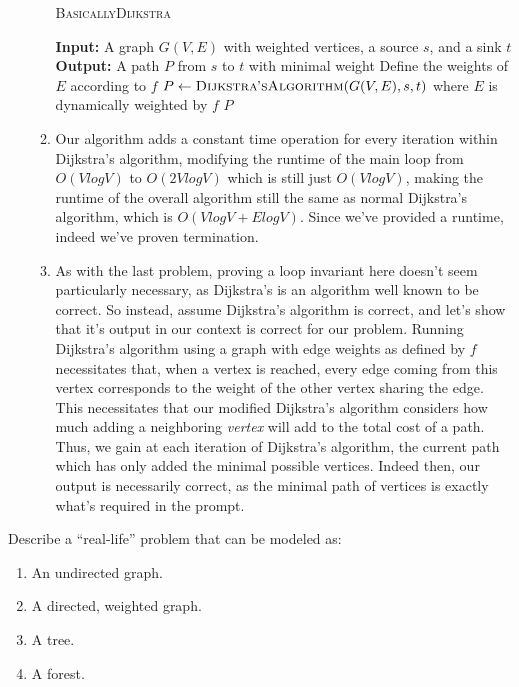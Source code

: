 \documentclass{article}
\begin{document}
\begin{enumerate}
\begin{enumerate}
		\begin{algorithm}
			\begin{algorithmic}
				\caption{\textsc{BasicallyDijkstra}}
				\State \textbf{Input:} A graph $G(V,E)$ with weighted vertices, a source $s$, and a sink $t$
				\State \textbf{Output:} A path $P$ from $s$ to $t$ with minimal weight
				\State Define the weights of $E$ according to $f$
				\State $P \gets \textsc{Dijkstra'sAlgorithm}(G(V,E), s, t)$ where $E$ is dynamically weighted by $f$
				\State \Return $P$
			\end{algorithmic}
		\end{algorithm}
			\item Our algorithm adds a constant time operation for every iteration within Dijkstra's algorithm, modifying
				the runtime of the main loop from $O(VlogV)$ to $O(2VlogV)$ which is still just $O(VlogV)$, making the
				runtime of the overall algorithm still the same as normal Dijkstra's algorithm, which is $O(VlogV + ElogV)$.
				Since we've provided a runtime, indeed we've proven termination.
			\item As with the last problem, proving a loop invariant here doesn't seem particularly necessary, as Dijkstra's
				is an algorithm well known to be correct. So instead, assume Dijkstra's algorithm is correct, and let's show
				that it's output in our context is correct for our problem. Running Dijkstra's algorithm using a graph with
				edge weights as defined by $f$ necessitates that, when a vertex is reached, every edge coming from this
				vertex corresponds to the weight of the other vertex sharing the edge. This necessitates that our modified
				Dijkstra's algorithm considers how much adding a neighboring \textit{vertex} will add to the total cost of 
				a path. Thus, we gain at each iteration of Dijkstra's algorithm, the current path which has only added the 
				minimal possible vertices. Indeed then, our output is necessarily correct, as the minimal path of vertices 
				is exactly what's required in the prompt. 
	\end{enumerate}

\end{enumerate}





\nextprob
{}

Describe a ``real-life'' problem that can be modeled as:

\begin{enumerate}
    \item An undirected graph.
    \item A directed, weighted graph.
    \item A tree.
    \item A forest.
\end{enumerate}
\end{document}
